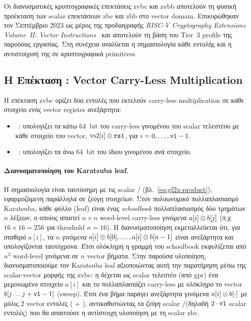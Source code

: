 Οι διανυσματικές κρυπτογραφικές επεκτάσεις \gls{zvbc} και \gls{zvbb} αποτελούν τη
φυσική προέκταση των scalar επεκτάσεων \gls{zbc} και \gls{zbb} στο vector domain. 
Επικυρώθηκαν τον Σεπτέμβριο 2023 ως μέρος της προδιαγραφής \emph{RISC-V Cryptography Extensions Volume~II: Vector Instructions}~\cite{RISCV-crypto-vol2,RISCV-ratified-ext} και
αποτελούν τη βάση του Tier~3 profile της παρούσας εργασίας.
Στη συνέχεια αναλύεται η σημασιολογία κάθε εντολής και η αντιστοίχισή
της σε κρυπτογραφικά primitives.

\subsection{Η Επέκταση \Zvbc: Vector Carry-Less Multiplication}
\label{ssec:zvbc-extension}

Η επέκταση \gls{zvbc} ορίζει δύο εντολές που εκτελούν carry-less multiplication
σε κάθε στοιχείο ενός vector register ανεξάρτητα:

\begin{itemize}
  \item \vclmul~: υπολογίζει τα κάτω 64~bit του
    carry-less γινομένου του scalar τελεστέου 
    με κάθε στοιχείο του vector, $\text{vs2}[i] \otimes \texttt{rs1}$, για
    $i = 0, \ldots, \texttt{vl}-1$.
  \item \vclmulh~: υπολογίζει τα άνω 64~bit του
    ίδιου γινομένου ανά στοιχείο.
\end{itemize}

\paragraph{Διανυσματοποίηση του Karatsuba leaf.}
Η σημασιολογία είναι ταυτόσημη με τις scalar \clmul/\clmulh
(βλ.~\cref{eq:gf2x-product}), εφαρμοζόμενη παράλληλα σε  ζεύγη
στοιχείων. Στον πολυωνυμικό πολλαπλασιασμό Karatsuba, κάθε φύλλο (leaf)
είναι ένας \emph{schoolbook} πολλαπλασιασμός δύο τμημάτων $n$ λέξεων, ο
οποίος απαιτεί $n \times n$ word-level carry-less γινόμενα
$a[i] \otimes b[j]$ (π.χ. $16 \times 16 = 256$ για threshold $n = 16$). Η
διανυσματοποίηση εκμεταλλεύεται ότι, για \emph{σταθερό} $a[i]$, τα $n$
γινόμενα $a[i] \otimes b[0], \ldots, a[i] \otimes b[n-1]$ είναι
ανεξάρτητα και υπολογίζονται ταυτόχρονα. Έτσι ολόκληρη η γραμμή του
schoolbook εκφυλίζεται από $n^2$ word-level γινόμενα σε $n$ vector βήματα.
Στην παρούσα υλοποίηση, διανυσματοποιούμε τον Karatsuba leaf αξιοποιώντας
αυτή την παρατήρηση μέσω της scalar-vector μορφής της \gls{zvbc}: η
 δέχεται ως scalar τελεστέο (από \gls{gpr}) ένα μεμονωμένο
στοιχείο $a[i]$ και το πολλαπλασιάζει carry-less με ολόκληρο το vector
$b[j \ldots j + \texttt{vl} - 1]$ (sweep). Έτσι \emph{ένα} βήμα παράγει
 ανεξάρτητα γινόμενα $a[i] \otimes b[\cdot]$ με μόλις \num{2}
vector εντολές ( + ), αντικαθιστώντας τα
\emph{ ζεύγη} scalar \clmul/\clmulh (δηλαδή $2\cdot\texttt{vl}$
scalar εντολές) που θα απαιτούσε η αντίστοιχη υλοποίηση με τη scalar
\gls{zbc}.

